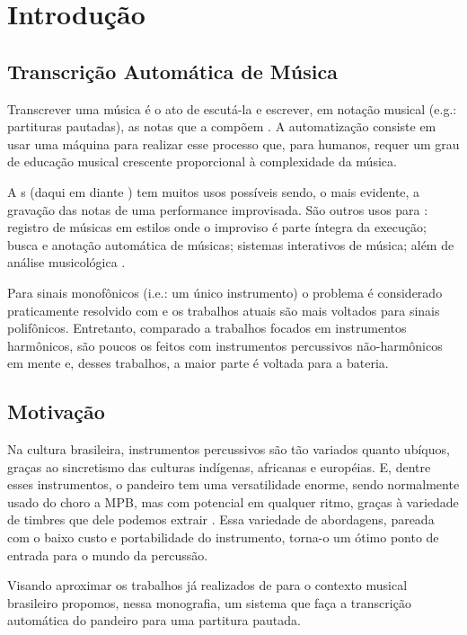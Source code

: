 \documentclass[
  dissertacao,
  brazil
]{ThesisPUC}
\begin{document}

\chapter{Introdução}
\section{Transcrição Automática de Música}
Transcrever uma música é o ato de escutá-la e escrever, em notação musical (e.g.: partituras pautadas), as notas que a compõem \cite{martin1996blackboard}. A automatização consiste em usar uma máquina para realizar esse processo que, para humanos, requer um grau de educação musical crescente proporcional à complexidade da música.

A \tam s (daqui em diante \TAM) tem muitos usos possíveis sendo, o mais evidente, a gravação das notas de uma performance improvisada. São outros usos para \TAM: registro de músicas em estilos onde o improviso é parte íntegra da execução; busca e anotação automática de músicas; sistemas interativos de música; além de análise musicológica \cite{benetos2013automatic}.

Para sinais monofônicos (i.e.: um único instrumento) o problema é considerado praticamente resolvido com \cite{klapuri1998automatic} e os trabalhos atuais são mais voltados para sinais polifônicos. Entretanto, comparado a trabalhos focados em instrumentos harmônicos, são poucos os feitos com instrumentos percussivos não-harmônicos em mente e, desses trabalhos, a maior parte é voltada para a bateria. 

\section{Motivação}

Na cultura brasileira, instrumentos percussivos são tão variados quanto ubíquos, graças ao sincretismo das culturas indígenas, africanas e européias. E, dentre esses instrumentos, o pandeiro tem uma versatilidade enorme, sendo normalmente usado do choro a MPB, mas com potencial em qualquer ritmo, graças à variedade de timbres que dele podemos extrair \cite{magalhaes2016pandeiro}. Essa variedade de abordagens, pareada com o baixo custo e portabilidade do instrumento, torna-o um ótimo ponto de entrada para o mundo da percussão. 

Visando aproximar os trabalhos já realizados de \TAM \space para o contexto musical brasileiro propomos, nessa monografia, um sistema que faça a transcrição automática do pandeiro para uma partitura pautada.
\end{document}
